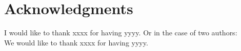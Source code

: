 \documentclass[nomenclature, english, bibtex]{kththesis}
\newcommand*{\engExpl}[1]{\todo[inline, backgroundcolor=kth-lightgreen40]{#1}} %
\newcommand*{\sweExpl}[1]{\todo[inline, backgroundcolor=kth-lightblue40]{#1}}  %
\numberwithin{listing}{chapter}
\begin{document}

\section*{Acknowledgments}



I would like to thank xxxx for having yyyy. Or in the case of two authors:\\
We would like to thank xxxx for having yyyy.
\end{document}
